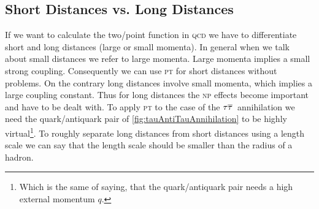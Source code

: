 \documentclass[../../index.tex]{subfiles}
\begin{document}
\subsection{Short Distances vs. Long Distances}
If we want to calculate the two\-/point function in \textsc{qcd} we have to
differentiate short and long distances (large or small momenta). In
general when we talk about small distances we refer to large momenta. Large
momenta implies a small strong coupling. Consequently we can use
\textsc{pt} for short distances without problems. On the contrary long
distances involve small momenta, which implies a large coupling constant. Thus
for long distances the \textsc{np} effects become important and have to be dealt
with. To apply \textsc{pt} to the case of the \(\tau\overline{\tau}\,\) annihilation
we need the quark\-/antiquark pair of \cref{fig:tauAntiTauAnnihilation} to be
highly virtual\footnote{Which is the same of saying, that the quark\-/antiquark
  pair needs a high external momentum \(q\).}. To roughly separate
long distances from short distances using a length scale we can say that the
length scale should be smaller than the radius of a hadron.
\end{document}

